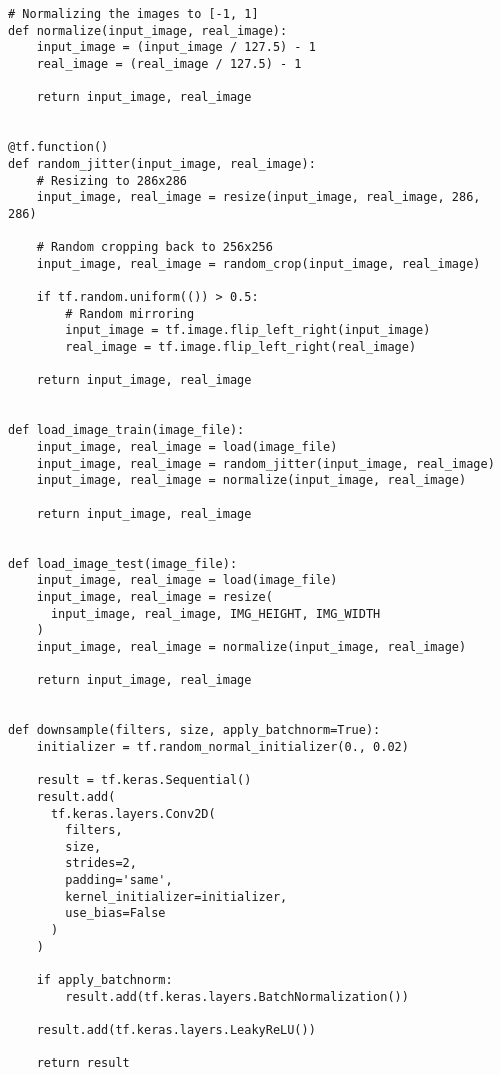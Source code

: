 \pagebreak
\begin{lstlisting}
# Normalizing the images to [-1, 1]
def normalize(input_image, real_image):
    input_image = (input_image / 127.5) - 1
    real_image = (real_image / 127.5) - 1

    return input_image, real_image


@tf.function()
def random_jitter(input_image, real_image):
    # Resizing to 286x286
    input_image, real_image = resize(input_image, real_image, 286, 286)

    # Random cropping back to 256x256
    input_image, real_image = random_crop(input_image, real_image)

    if tf.random.uniform(()) > 0.5:
        # Random mirroring
        input_image = tf.image.flip_left_right(input_image)
        real_image = tf.image.flip_left_right(real_image)

    return input_image, real_image


def load_image_train(image_file):
    input_image, real_image = load(image_file)
    input_image, real_image = random_jitter(input_image, real_image)
    input_image, real_image = normalize(input_image, real_image)

    return input_image, real_image


def load_image_test(image_file):
    input_image, real_image = load(image_file)
    input_image, real_image = resize(
      input_image, real_image, IMG_HEIGHT, IMG_WIDTH
    )
    input_image, real_image = normalize(input_image, real_image)

    return input_image, real_image


def downsample(filters, size, apply_batchnorm=True):
    initializer = tf.random_normal_initializer(0., 0.02)

    result = tf.keras.Sequential()
    result.add(
      tf.keras.layers.Conv2D(
        filters,
        size,
        strides=2,
        padding='same',
        kernel_initializer=initializer,
        use_bias=False
      )
    )

    if apply_batchnorm:
        result.add(tf.keras.layers.BatchNormalization())

    result.add(tf.keras.layers.LeakyReLU())

    return result

\end{lstlisting}
\pagebreak
